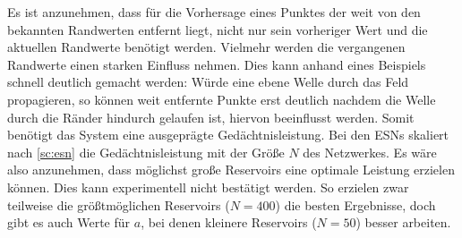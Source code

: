 Es ist anzunehmen, dass für die Vorhersage eines Punktes der weit von den bekannten Randwerten entfernt liegt, nicht nur sein vorheriger Wert und die aktuellen Randwerte benötigt werden. Vielmehr werden die vergangenen Randwerte einen starken Einfluss nehmen. Dies kann anhand eines Beispiels schnell deutlich gemacht werden: Würde eine ebene Welle durch das Feld propagieren, so können weit entfernte Punkte erst deutlich nachdem die Welle durch die Ränder hindurch gelaufen ist, hiervon beeinflusst werden. Somit benötigt das System eine ausgeprägte Gedächtnisleistung. Bei den \textsc{ESN}s skaliert nach \ref{sc:esn} die Gedächtnisleistung mit der Größe $N$ des Netzwerkes. Es wäre also anzunehmen, dass möglichst große Reservoirs eine optimale Leistung erzielen können. Dies kann experimentell nicht bestätigt werden. So erzielen zwar teilweise die größtmöglichen Reservoirs ($N=400$) die besten Ergebnisse, doch gibt es auch Werte für $a$, bei denen kleinere Reservoirs ($N=50$) besser arbeiten.\\

